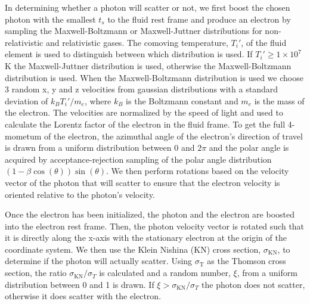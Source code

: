 \documentclass[12pt,a4paper]{article}
\begin{document}
In determining whether a photon will scatter or not, we first boost the chosen photon with the smallest $t_s$ to the fluid rest frame and produce an electron by sampling the Maxwell-Boltzmann or Maxwell-Juttner distributions for non-relativistic and relativistic gases. The comoving temperature, $T_i'$, of the fluid element is used to distinguish between which distribution is used. If $T_i' \ge 1 \times 10^7$ K the Maxwell-Juttner distribution is used, otherwise the Maxwell-Boltzmann distribution is used. When the Maxwell-Boltzmann distribution is used we choose 3 random x, y and z velocities from gaussian distributions with a standard deviation of $k_BT_i'/m_e$, where $k_B$ is the Boltzmann constant and $m_e$ is the mass of the electron. The velocities are normalized by the speed of light and used to calculate the Lorentz factor of the electron in the fluid frame. To get the full 4-mometum of the electron, the azimuthal angle of the electron's direction of travel is drawn from a uniform distribution between 0 and $2\pi$ and the polar angle is acquired by acceptance-rejection sampling of the polar angle distribution $(1-\beta\cos(\theta))\sin(\theta) $. We then perform rotations based on the velocity vector of the photon that will scatter to ensure that the electron velocity is oriented relative to the photon's velocity.

Once the electron has been initialized, the photon and the electron are boosted into the electron rest frame. Then, the photon velocity vector is rotated such that it is directly along the x-axis with the stationary electron at the origin of the coordinate system. We then use the Klein Nishina (KN) cross section, $\sigma_\mathrm{KN}$, to determine if the photon will actually scatter.  Using $\sigma_{\mathrm{T}}$ as the Thomson cross section, the ratio $\sigma_\mathrm{KN}/\sigma_T$ is calculated and a random number, $\xi$, from a uniform distribution between 0 and 1 is drawn. If $\xi >\sigma_\mathrm{KN}/\sigma_T $ the photon does not scatter, otherwise it does scatter with the electron. 
\end{document}
